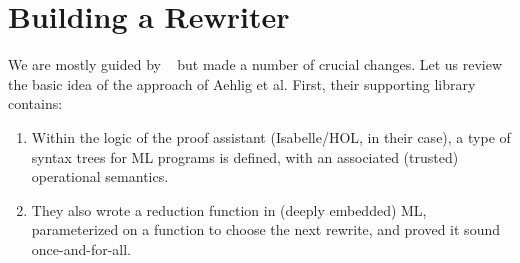 \documentclass[sn-mathphys,pdflatex]{sn-jnl}%
\newcommand{\citetfield}[1]{\usebibentry{#1}{citet}~\cite{#1}}
\theoremstyle{thmstyleone}%
\theoremstyle{thmstyletwo}%
\theoremstyle{thmstylethree}%
\begin{document}





\section{Building a Rewriter}\label{sec:structure}
We are mostly guided by \citetfield{Aehlig} but made a number of crucial changes.
Let us review the basic idea of the approach of Aehlig et al.
First, their supporting library contains:
\begin{enumerate}
\item
  Within the logic of the proof assistant (Isabelle/HOL, in their case), a type of syntax trees for ML programs is defined, with an associated (trusted) operational semantics.
\item
  They also wrote a reduction function in (deeply embedded) ML, parameterized on a function to choose the next rewrite, and proved it sound once-and-for-all.
\end{enumerate}
\end{document}
